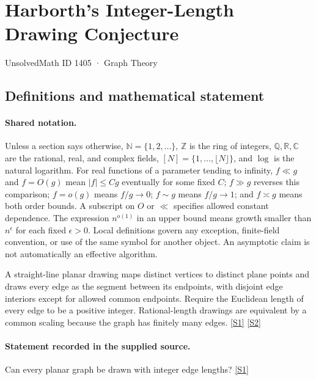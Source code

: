 \documentclass[11pt,a4paper]{article}
\newcommand{\N}{\mathbb{N}}
\newcommand{\Z}{\mathbb{Z}}
\newcommand{\Q}{\mathbb{Q}}
\newcommand{\R}{\mathbb{R}}
\newcommand{\C}{\mathbb{C}}
\newcommand{\sref}[2]{\hyperlink{source:#1:#2}{[S#2]}}
\begin{document}

\setcounter{section}{1404}

\section{Harborth’s Integer-Length Drawing Conjecture}\label{1405}

{\small\sffamily UnsolvedMath ID 1405 · Graph Theory}

\subsection{Definitions and mathematical statement}

\paragraph{Shared notation.}Unless a section says otherwise, $\N=\{1,2,\ldots\}$,
$\Z$ is the ring of integers, $\Q,\R,\C$ are the rational, real, and complex
fields, $[N]=\{1,\ldots,\lfloor N\rfloor\}$, and $\log$ is the natural
logarithm. For real functions of a parameter tending to infinity,
$f\ll g$ and $f=O(g)$ mean $|f|\leq Cg$ eventually for some fixed $C$;
$f\gg g$ reverses this comparison; $f=o(g)$ means $f/g\to0$;
$f\sim g$ means $f/g\to1$; and $f\asymp g$ means both order bounds.
A subscript on $O$ or $\ll$ specifies allowed constant dependence.
The expression $n^{o(1)}$ in an upper bound means growth smaller than
$n^\epsilon$ for each fixed $\epsilon>0$. Local definitions govern any
exception, finite-field convention, or use of the same symbol for another
object. An asymptotic claim is not automatically an effective algorithm.



A straight-line planar drawing maps distinct vertices to distinct plane points and draws every edge as the segment between its endpoints, with disjoint edge interiors except for allowed common endpoints. Require the Euclidean length of every edge to be a positive integer. Rational-length drawings are equivalent by a common scaling because the graph has finitely many edges. \sref{1405}{1} \sref{1405}{2}

\paragraph{Statement recorded in the supplied source.}
Can every planar graph be drawn with integer edge lengths? \sref{1405}{1}
\end{document}

